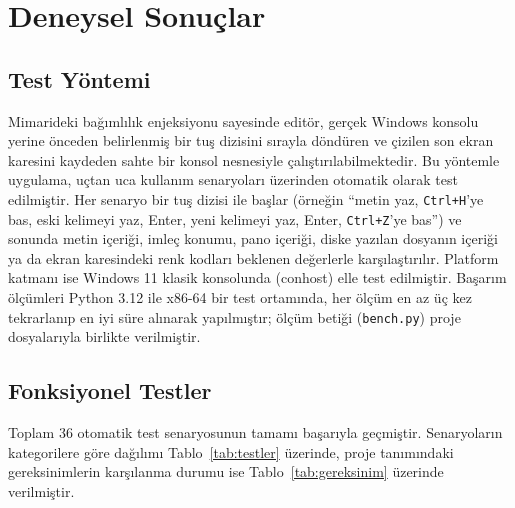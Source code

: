 \documentclass[conference,a4paper]{IEEEtran}
\newcommand{\kod}[1]{\texttt{#1}}
\begin{document}
\section{Deneysel Sonuçlar}\label{sec:deney}

\subsection{Test Yöntemi}

Mimarideki bağımlılık enjeksiyonu sayesinde editör, gerçek Windows konsolu yerine önceden belirlenmiş bir tuş dizisini sırayla döndüren ve çizilen son ekran karesini kaydeden sahte bir konsol nesnesiyle çalıştırılabilmektedir. Bu yöntemle uygulama, uçtan uca kullanım senaryoları üzerinden otomatik olarak test edilmiştir. Her senaryo bir tuş dizisi ile başlar (örneğin ``metin yaz, \kod{Ctrl+H}'ye bas, eski kelimeyi yaz, Enter, yeni kelimeyi yaz, Enter, \kod{Ctrl+Z}'ye bas'') ve sonunda metin içeriği, imleç konumu, pano içeriği, diske yazılan dosyanın içeriği ya da ekran karesindeki renk kodları beklenen değerlerle karşılaştırılır. Platform katmanı ise Windows 11 klasik konsolunda (conhost) elle test edilmiştir. Başarım ölçümleri Python 3.12 ile x86-64 bir test ortamında, her ölçüm en az üç kez tekrarlanıp en iyi süre alınarak yapılmıştır; ölçüm betiği (\kod{bench.py}) proje dosyalarıyla birlikte verilmiştir.

\subsection{Fonksiyonel Testler}

Toplam 36 otomatik test senaryosunun tamamı başarıyla geçmiştir. Senaryoların kategorilere göre dağılımı Tablo~\ref{tab:testler} üzerinde, proje tanımındaki gereksinimlerin karşılanma durumu ise Tablo~\ref{tab:gereksinim} üzerinde verilmiştir.
\end{document}
